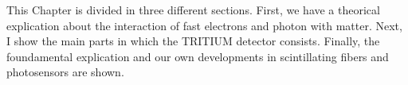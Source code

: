 This Chapter is divided in three different sections. First, we have a theorical explication about the interaction of fast electrons and photon with matter. Next, I show the main parts in which the TRITIUM detector consists. Finally, the foundamental explication and our own developments in scintillating fibers and photosensors are shown.
